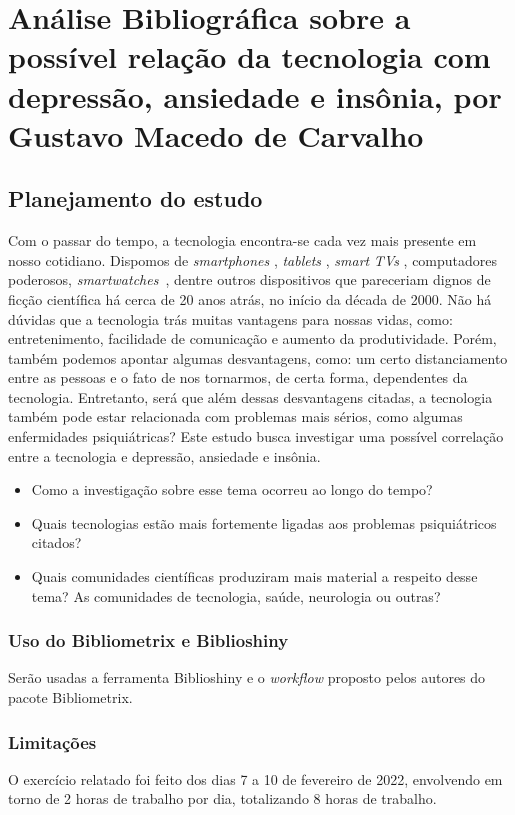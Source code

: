 \chapter{Análise Bibliográfica sobre a possível relação da tecnologia com depressão, ansiedade e insônia, por Gustavo Macedo de Carvalho\label{chap:bibliometria:GustavoMacCar}}

\section{Planejamento do estudo}
Com o passar do tempo, a tecnologia encontra-se cada vez mais presente em nosso cotidiano. Dispomos de \textit{smartphones} , \textit{tablets} , \textit{smart} \textit{TVs} , computadores poderosos, \textit{smartwatches}\ , dentre outros dispositivos que pareceriam
dignos de ficção científica há cerca de 20 anos atrás, no início da década de 2000. Não há dúvidas que a tecnologia trás muitas vantagens para nossas vidas, como: entretenimento, facilidade de comunicação e aumento da produtividade.
Porém, também podemos apontar algumas desvantagens, como: um certo distanciamento entre as pessoas e o fato de nos tornarmos, de certa forma, dependentes da tecnologia. Entretanto, será que além dessas desvantagens citadas, a tecnologia também
pode estar relacionada com problemas mais sérios, como algumas enfermidades psiquiátricas? Este estudo busca investigar uma possível correlação entre a tecnologia e depressão, ansiedade e insônia.
\begin{itemize}
    \item Como a investigação sobre esse tema ocorreu ao longo do tempo?
    \item Quais tecnologias estão mais fortemente ligadas aos problemas psiquiátricos citados?
    \item Quais comunidades científicas produziram mais material a respeito desse tema? As comunidades de tecnologia, saúde, neurologia ou outras?
\end{itemize}

\subsection{Uso do Bibliometrix e Biblioshiny}
Serão usadas a ferramenta Biblioshiny e o \textit{workflow} proposto pelos autores do pacote Bibliometrix.

\subsection{Limitações} O exercício relatado foi feito dos dias 7 a 10 de fevereiro de 2022, envolvendo em torno de 2 horas de trabalho por dia, totalizando 8 horas de trabalho.

